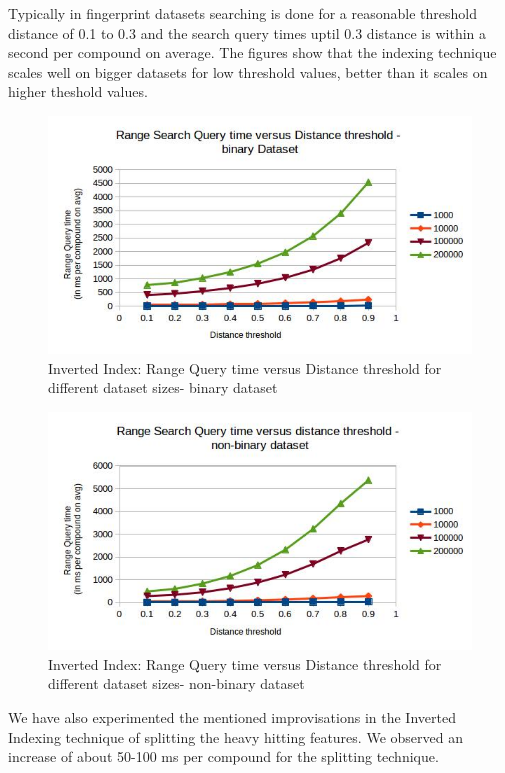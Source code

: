 Typically in fingerprint datasets searching is done for a reasonable threshold distance of 0.1 to 0.3 and the search query times uptil 0.3 distance is within a second per compound on average. The figures show that the indexing technique scales well on bigger datasets for low threshold values, better than it scales on higher theshold values.


\begin{figure}[ht]	
\centering
\includegraphics[width=1 \columnwidth]{img/imageI2.jpg}
\caption{Inverted Index: Range Query time versus Distance threshold for different dataset sizes- binary dataset}
\label{fig:5I2}
\end{figure}

\begin{figure}[ht!]	
\centering
\includegraphics[width=1 \columnwidth]{img/imageI3.jpg}
\caption{Inverted Index: Range Query time versus Distance threshold for different dataset sizes- non-binary dataset}
\label{fig:5I3}
\end{figure}


We have also experimented the mentioned improvisations in the Inverted Indexing technique of splitting the heavy hitting features. We observed an increase of about 50-100 ms per compound for the splitting technique.



